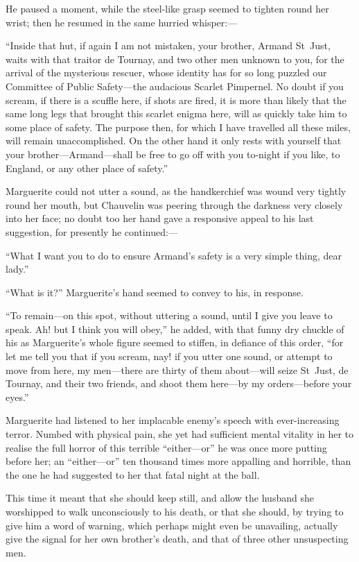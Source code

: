 He paused a moment, while the steel-like grasp seemed to tighten round her wrist; then he resumed in the same hurried whisper:---

\enquote{Inside that hut, if again I am not mistaken, your brother, Armand St~Just, waits with that traitor de Tournay, and two other men unknown to you, for the arrival of the mysterious rescuer, whose identity has for so long puzzled our Committee of Public Safety---the audacious Scarlet Pimpernel. No doubt if you scream, if there is a scuffle here, if shots are fired, it is more than likely that the same long legs that brought this scarlet enigma here, will as quickly take him to some place of safety. The purpose then, for which I have travelled all these miles, will remain unaccomplished. On the other hand it only rests with yourself that your brother---Armand---shall be free to go off with you to-night if you like, to England, or any other place of safety.}

Marguerite could not utter a sound, as the handkerchief was wound very tightly round her mouth, but Chauvelin was peering through the darkness very closely into her face; no doubt too her hand gave a responsive appeal to his last suggestion, for presently he continued:---

\enquote{What I want you to do to ensure Armand's safety is a very simple thing, dear lady.}

\enquote{What is it?} Marguerite's hand seemed to convey to his, in response.

\enquote{To remain---on this spot, without uttering a sound, until I give you leave to speak. Ah! but I think you will obey,} he added, with that funny dry chuckle of his as Marguerite's whole figure seemed to stiffen, in defiance of this order, \enquote{for let me tell you that if you scream, nay! if you utter one sound, or attempt to move from here, my men---there are thirty of them about---will seize St~Just, de Tournay, and their two friends, and shoot them here---by my orders---before your eyes.}

Marguerite had listened to her implacable enemy's speech with ever-increasing terror. Numbed with physical pain, she yet had sufficient mental vitality in her to realise the full horror of this terrible \enquote{either---or} he was once more putting before her; an \enquote{either---or} ten thousand times more appalling and horrible, than the one he had suggested to her that fatal night at the ball.

This time it meant that she should keep still, and allow the husband she worshipped to walk unconsciously to his death, or that she should, by trying to give him a word of warning, which perhaps might even be unavailing, actually give the signal for her own brother's death, and that of three other unsuspecting men.

